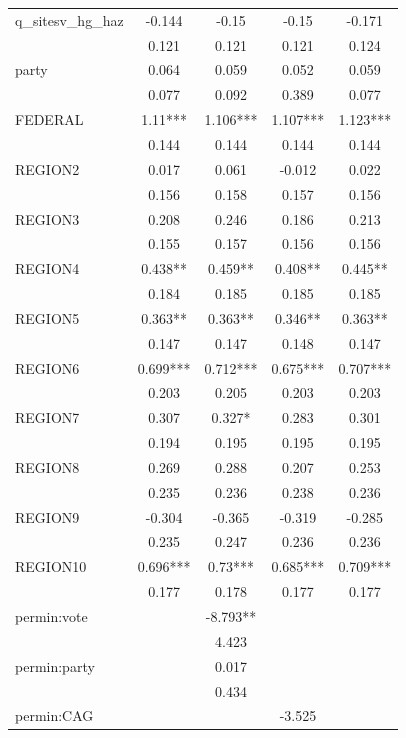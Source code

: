 \documentclass[12pt]{article}
\begin{document}
{\begin{table}[!ht]
\begin{tabular}{l|cccc}
        q\_sitesv\_hg\_haz & -0.144 & -0.15 & -0.15 & -0.171 \\ 
        ~ & 0.121 & 0.121 & 0.121 & 0.124 \\ \hline
        party & 0.064 & 0.059 & 0.052 & 0.059 \\ 
        ~ & 0.077 & 0.092 & 0.389 & 0.077 \\ 
        FEDERAL & 1.11*** & 1.106*** & 1.107*** & 1.123*** \\ 
        ~ & 0.144 & 0.144 & 0.144 & 0.144 \\ 
        REGION2 & 0.017 & 0.061 & -0.012 & 0.022 \\ 
        ~ & 0.156 & 0.158 & 0.157 & 0.156 \\ 
        REGION3 & 0.208 & 0.246 & 0.186 & 0.213 \\ 
        ~ & 0.155 & 0.157 & 0.156 & 0.156 \\ 
        REGION4 & 0.438** & 0.459** & 0.408** & 0.445** \\ 
        ~ & 0.184 & 0.185 & 0.185 & 0.185 \\ 
        REGION5 & 0.363** & 0.363** & 0.346** & 0.363** \\ 
        ~ & 0.147 & 0.147 & 0.148 & 0.147 \\ 
        REGION6 & 0.699*** & 0.712*** & 0.675*** & 0.707*** \\ 
        ~ & 0.203 & 0.205 & 0.203 & 0.203 \\ 
        REGION7 & 0.307 & 0.327* & 0.283 & 0.301 \\ 
        ~ & 0.194 & 0.195 & 0.195 & 0.195 \\ 
        REGION8 & 0.269 & 0.288 & 0.207 & 0.253 \\ 
        ~ & 0.235 & 0.236 & 0.238 & 0.236 \\ 
        REGION9 & -0.304 & -0.365 & -0.319 & -0.285 \\ 
        ~ & 0.235 & 0.247 & 0.236 & 0.236 \\ 
        REGION10 & 0.696*** & 0.73*** & 0.685*** & 0.709*** \\ 
        ~ & 0.177 & 0.178 & 0.177 & 0.177 \\ \hline
        permin:vote & ~ & -8.793** & ~ & ~ \\ 
        ~ & ~ & 4.423 & ~ & ~ \\ 
        permin:party & ~ & 0.017 & ~ & ~ \\ 
        ~ & ~ & 0.434 & ~ & ~ \\ \hline
        permin:CAG & ~ & ~ & -3.525 & ~ \\ 

\end{tabular}
\end{table}}
\end{document}
